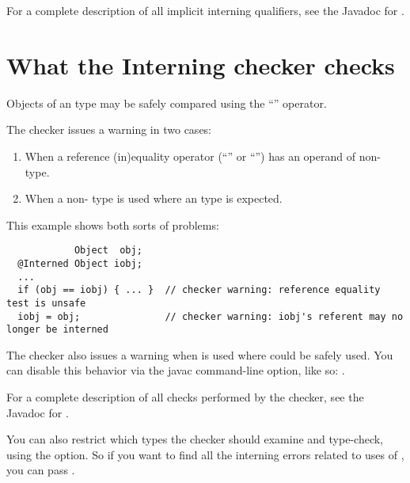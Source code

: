 For a complete description of all implicit interning qualifiers, see the
Javadoc for .


\section{What the Interning checker checks\label{interning-checks}}

Objects of an  type may be safely compared using the ``\code{==}''
operator.

The checker issues a warning in two cases:

\begin{enumerate}

\item
  When a reference (in)equality operator (``\code{==}'' or ``\code{!=}'')
  has an operand of non- type.

\item
  When a non- type is used where an  type
  is expected.

\end{enumerate}

This example shows both sorts of problems:

\begin{Verbatim}
            Object  obj;
  @Interned Object iobj;
  ...
  if (obj == iobj) { ... }  // checker warning: reference equality test is unsafe
  iobj = obj;               // checker warning: iobj's referent may no longer be interned
\end{Verbatim}

\label{lint-dotequals}

The checker also issues a warning when  is used where
\code{==} could be safely used.  You can disable this behavior via the
javac  command-line option, like so: .

For a complete description of all checks performed by
  the checker, see the Javadoc for
  .

\label{checking-class}
You can also restrict which types the checker should examine and type-check,
using the  option.  So if you want to find all the
interning errors related to uses of , you can pass
.

